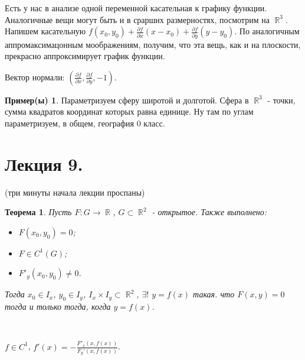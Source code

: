 \documentclass[a4paper,100pt]{article}
\theoremstyle{indented}
\newtheorem{theorem}{Теорема}
\theoremstyle{definition}
\newtheorem{exl}{Пример(ы)}
\theoremstyle{remark}
\DeclareMathOperator{\RR}{\mathbb{R}}
\begin{document}
Есть у нас в анализе одной переменной касательная к графику функции. Аналогичные вещи могут быть и в срарших размерностях, посмотрим на $\RR^3$. Напишем касательную $f(x_0,y_0)+\frac{\partial f}{\partial x}(x-x_0)+\frac{\partial f}{\partial y}(y-y_0)$. По аналогичным аппромаксимацонным моображениям, получим, что эта вещь, как и на плоскости, прекрасно аппроксимирует график функции. \ 

Вектор нормали: $(\frac{\partial f}{\partial x}, \frac{\partial f}{\partial y}, -1)$. 

\begin{exl}
    Параметризуем сферу широтой и долготой. Сфера в $\RR^3$ - точки, сумма квадратов координат которых равна единице. Ну там по углам параметризуем, в общем, география 0 класс. 
\end{exl}

\section{Лекция 9.}

(три минуты начала лекции проспаны) \\ 

\begin{theorem}
    Пусть $F:G\rightarrow \RR$, $G\subset \RR^2$ - открытое. Также выполнено: 

    \begin{itemize}
        \item $F(x_0, y_0)=0$; 
        \item $F\in C^1(G)$; 
        \item $F'_y(x_0, y_0)\neq 0$. 
    \end{itemize}

    Тогда $x_0\in I_x$, $y_0\in I_y$, $I_x\times I_y\subset \RR^2$, $\exists !$ $y=f(x)$ такая. что $F(x, y)=0$ тогда и только тогда, когда $y=f(x)$. 
\end{theorem}\ 

$f\in C^1$, $f'(x)=-\frac{F'_x(x, f(x))}{F_y'(x, f(x))}$. 
\end{document}
